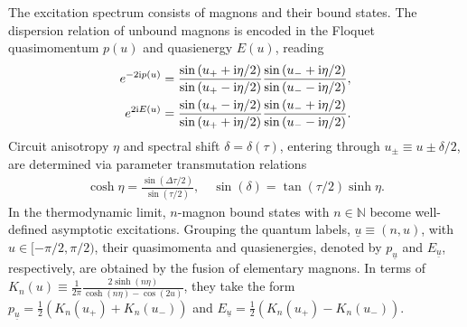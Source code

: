 \documentclass[
twocolumn,
amsfonts,
showpacs,
superscriptaddress,
amsmath,
amssymb,
aps,
longbibliography,
prl,
noeprint
]{revtex4-2}
\newcounter{ls}
\newcommand{\ii}{{\rm i}}
\newcommand{\1}{{\bf 1}}
\begin{document}
The excitation spectrum consists of magnons and their bound states. The dispersion relation of unbound magnons is encoded in the Floquet quasimomentum $p(u)$ and quasienergy $E(u)$, reading
\begin{align}
    e^{-2\ii p(u)} = \frac{\sin{(u_{+}+\ii \eta/2)}}{\sin{(u_{+}-\ii \eta/2)}}
    \frac{\sin{(u_{-}+\ii \eta/2)}}{\sin{(u_{-}-\ii \eta/2)}},\\
     e^{2\ii E(u)} = \frac{\sin{(u_{+}-\ii \eta/2)}}{\sin{(u_{+}+\ii \eta/2)}}
    \frac{\sin{(u_{-}+\ii \eta/2)}}{\sin{(u_{-}-\ii \eta/2)}}.
\end{align}
Circuit anisotropy $\eta$ and spectral shift $\delta=\delta(\tau)$, entering through $u_{\pm} \equiv u\pm \delta/2$, are determined via parameter transmutation relations
\begin{align}
    \cosh \eta = \frac{\sin{(\Delta \tau/2)}}{\sin{(\tau/2)}},\quad
    \sin{(\delta)} = \tan{(\tau/2)} \sinh \eta.
\end{align}
In the thermodynamic limit, $n$-magnon bound states with $n\in \mathbb{N}$ become well-defined asymptotic excitations. Grouping the quantum labels, $\underline{u}\equiv (n,u)$, with $u\in [-\pi/2,\pi/2)$, their quasimomenta and quasienergies, denoted by $p_{\underline{u}}$ and $E_{\underline{u}}$, respectively, are obtained by the fusion of elementary magnons. In terms of $K_{n}(u)\equiv\tfrac{1}{2\pi}\tfrac{2\sinh{(n\eta)}}{\cosh{(n\eta)}-\cos{(2u)}}$, they take the form $p_{\underline{u}}=\tfrac{1}{2}(K_{n}(u_{+})+K_{n}(u_{-}))$
and $E_{\underline{u}}=\tfrac{1}{2}(K_{n}(u_{+})-K_{n}(u_{-}))$.
\end{document}
